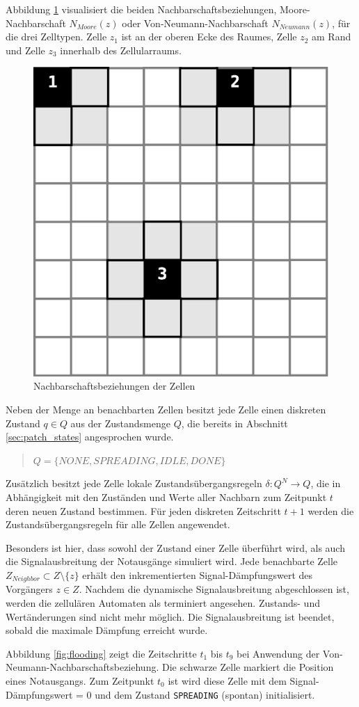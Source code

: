 Abbildung \ref{fig:neighborhood} visualisiert die beiden Nachbarschaftsbeziehungen, Moore-Nachbarschaft $ N_{Moore}(z)$ oder Von-Neumann-Nachbarschaft $ N_{Neumann}(z)$, für die drei Zelltypen. Zelle $z_{1}$ ist an der oberen Ecke des Raumes, Zelle $z_{2}$ am Rand und Zelle $z_{3}$ innerhalb des Zellularraums. 

\begin{figure}[!ht]
\centering
\includegraphics[height=0.3\textwidth]{algorithmik/neighborhood.eps}
\caption{Nachbarschaftsbeziehungen der Zellen}
\label{fig:neighborhood}
\end{figure}

Neben der Menge an benachbarten Zellen besitzt jede Zelle einen diskreten Zustand $q \in Q$ aus der Zustandsmenge $Q$, die bereits in Abschnitt \ref{sec:patch_states} angesprochen wurde.

\begin{quote}
$Q = \{NONE, SPREADING, IDLE, DONE\}$
\end{quote}

Zusätzlich besitzt jede Zelle lokale Zustandsübergangsregeln $\delta \colon Q^{N}\to Q$, die in Abhängigkeit mit den Zuständen und Werte aller Nachbarn zum Zeitpunkt $t$ deren neuen Zustand bestimmen. Für jeden diskreten Zeitschritt $t + 1$ werden die Zustandsübergangsregeln für alle Zellen angewendet.

Besonders ist hier, dass sowohl der Zustand einer Zelle überführt wird, als auch die Signalausbreitung der Notausgänge simuliert wird. Jede benachbarte Zelle $Z_{Neighbor} \subset Z\setminus\{z\}$ erhält den inkrementierten Signal-Dämpfungswert des Vorgängers $z \in Z$. Nachdem die dynamische Signalausbreitung abgeschlossen ist, werden die zellulären Automaten als terminiert angesehen. Zustands- und Wertänderungen sind nicht mehr möglich. Die Signalausbreitung ist beendet, sobald die maximale Dämpfung erreicht wurde.

Abbildung \ref{fig:flooding} zeigt die Zeitschritte $t_{1}$ bis $t_{9}$ bei Anwendung der Von-Neumann-Nachbarschaftsbeziehung. Die schwarze Zelle markiert die Position eines Notausgangs. Zum Zeitpunkt $t_{0}$ ist wird diese Zelle mit dem Signal-Dämpfungswert = 0 und dem Zustand \verb|SPREADING| (spontan) initialisiert.

